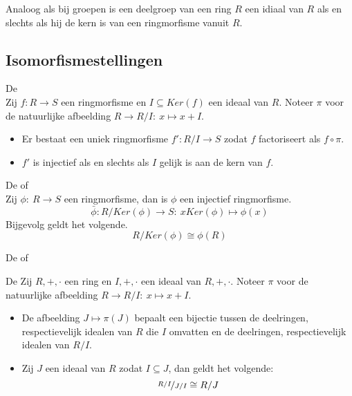 \documentclass[main.tex]{subfiles}
\begin{document}
\begin{opm}
  Analoog als bij groepen is een deelgroep van een ring $R$ een idiaal van $R$ als en slechts als hij de kern is van een ringmorfisme vanuit $R$.
\end{opm}

\subsection{Isomorfismestellingen}
\label{sec:isomorfismestellingen}

\begin{st}
  De \\
  Zij $f: R \rightarrow S$ een ringmorfisme en $I \subseteq Ker(f)$ een ideaal van $R$.
  Noteer $\pi$ voor de natuurlijke afbeelding $R \rightarrow R/I:\ x \mapsto x+I$.
  \begin{itemize}
  \item Er bestaat een uniek ringmorfisme $f': R/I \rightarrow S$ zodat $f$ factoriseert als $f \circ \pi$.
  \item $f'$ is injectief als en slechts als $I$ gelijk is aan de kern van $f$.
  \end{itemize}
\end{st}

\begin{gev}
  De  of \\
  Zij $\phi:\ R \rightarrow S$ een ringmorfisme, dan is $\phi$ een injectief ringmorfisme.
  \[ \bar{\phi}: R/Ker(\phi) \rightarrow S:\ xKer(\phi) \mapsto \phi(x) \]
  Bijgevolg geldt het volgende.
  \[ R/Ker(\phi) \cong \phi(R) \]
\end{gev}

\begin{st}
  De  of 
\end{st}

\begin{st}
  De 
  Zij $R,+,\cdot$ een ring en $I,+,\cdot$ een ideaal van $R,+,\cdot$.
  Noteer $\pi$ voor de natuurlijke afbeelding $R \rightarrow R/I:\ x \mapsto x+I$.
  \begin{itemize}
  \item De afbeelding $J\mapsto \pi(J)$ bepaalt een bijectie tussen de deelringen, respectievelijk idealen van $R$ die $I$ omvatten en de deelringen, respectievelijk idealen van $R/I$.
  \item Zij $J$ een ideaal van $R$ zodat $I \subseteq J$, dan geldt het volgende:
    \[ \nicefrac{R/I}{J/I} \cong R/J \]
  \end{itemize}
\end{st}
\end{document}
